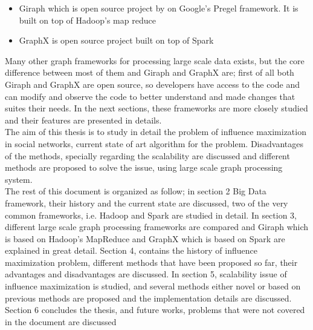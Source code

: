 \documentclass[english]{tktltiki}
\begin{document}
\begin{itemize}
\item 
Giraph which is open source project by on Google's Pregel framework. It is built on top of Hadoop's map reduce
\item 
GraphX is open source project built on top of Spark
\end{itemize}
Many other graph frameworks for processing large scale data exists, but the core difference between most of them and Giraph and GraphX are; first of all both Giraph and GraphX are open source, so developers have access to the code and can modify and observe the code to better understand and made changes that suites their needs. In the next sections, these frameworks are more closely studied and their features are presented in details. \\
The aim of this thesis is to study in detail the problem of influence maximization in social networks, current state of art algorithm for the problem. Disadvantages of the methods, specially regarding the scalability are discussed and different methods are proposed to solve the issue, using large scale graph processing system. \\
The rest of this document is organized as follow; in section 2 Big Data framework, their history and the current state are discussed, two of the very common frameworks, i.e. Hadoop and Spark are studied in detail. In section 3, different large scale graph processing frameworks are compared and Giraph which is based on Hadoop's MapReduce and GraphX which is based on Spark are explained in great detail. Section 4, contains the history of influence maximization problem, different methods that have been proposed so far, their advantages and disadvantages are discussed. In section 5, scalability issue of influence maximization is studied, and several methods either novel or based on previous methods are proposed and the implementation details are discussed. Section 6 concludes the thesis, and future works, problems that were not covered in the document are discussed


\newpage
\end{document}
